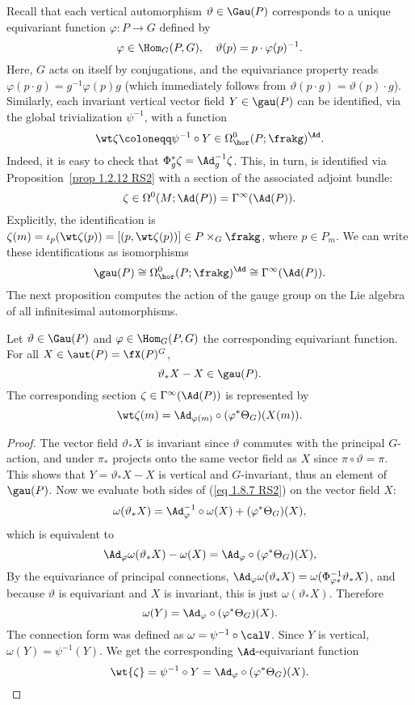 Recall that each vertical automorphism $\vartheta\in \Gau(P)$ corresponds to a unique equivariant function $\varphi:P\to G$ defined by 
\[\varphi\in \Hom_G(P,G),\quad \vartheta(p)=p\cdot \varphi(p)^{-1}.\]
Here, $G$ acts on itself by conjugations, and the equivariance property reads $\varphi(p\cdot g)=g^{-1}\varphi(p)g$ (which immediately follows from $\vartheta(p\cdot g)=\vartheta(p)\cdot g$). Similarly, each invariant vertical vector field $Y\in \gau(P)$ can be identified, via the global trivialization $\psi^{-1}$, with a function 
\[\wt\zeta\coloneqq \psi^{-1}\circ Y\in \Omega^0_{\hor}(P;\frakg)^\Ad.\]
Indeed, it is easy to check that $\Phi_g^\ast \zeta=\Ad_g^{-1}\zeta$. This, in turn, is identified via Proposition~\ref{prop 1.2.12 RS2} with a section of the associated adjoint bundle:
\[\zeta\in \Omega^0(M;\Ad(P))=\Gamma^\infty(\Ad(P)).\]
Explicitly, the identification is $\zeta(m)=\iota_p(\wt\zeta(p))=[(p,\wt\zeta(p))]\in P\times_G \frakg$, where $p\in P_m$.
We can write these identifications as isomorphisms
\[\gau(P)\cong \Omega^0_{\hor}(P;\frakg)^\Ad\cong \Gamma^\infty(\Ad(P)).\]
The next proposition computes the action of the gauge group on the Lie algebra of all infinitesimal automorphisms.

\begin{prop}
    Let $\vartheta\in\Gau(P)$ and $\varphi\in \Hom_G(P,G)$ the corresponding equivariant function. For all $X\in\aut(P)=\fX(P)^G$,
    \[\vartheta_\ast X-X\in\gau(P).\]
    The corresponding section $\zeta \in\Gamma^\infty(\Ad(P))$ is represented by
    \[\wt\zeta(m)=\Ad_{\varphi(m)}\circ(\varphi^\ast \Theta_G)(X(m)).\]
\end{prop}
\begin{proof}
    The vector field $\vartheta_\ast X$ is invariant since $\vartheta$ commutes with the principal $G$-action, and under $\pi_\ast$ projects onto the same vector field as $X$ since $\pi\circ\vartheta=\pi$. This shows that $Y=\vartheta_\ast X-X$ is vertical and $G$-invariant, thus an element of $\gau(P)$. Now we evaluate both sides of (\ref{eq 1.8.7 RS2}) on the vector field $X$:
    \[\omega(\vartheta_\ast X)=\Ad_{\varphi}^{-1}\circ \omega(X)+(\varphi^\ast \Theta_G)(X),\]
    which is equivalent to
    \[\Ad_\varphi\omega(\vartheta_\ast X)-\omega(X)=\Ad_\varphi\circ (\varphi^\ast \Theta_G)(X),\]
    By the equivariance of principal connections, $\Ad_\varphi\omega(\vartheta_\ast X)=\omega(\Phi_{\varphi\ast}^{-1}\vartheta_\ast X)$, and because $\vartheta$ is equivariant and $X$ is invariant, this is just $\omega(\vartheta_\ast X)$. Therefore
    \[\omega(Y)=\Ad_\varphi\circ (\varphi^\ast \Theta_G)(X).\]
    The connection form was defined as $\omega=\psi^{-1}\circ\calV$. Since $Y$ is vertical, $\omega(Y)=\psi^{-1}(Y)$. We get the corresponding $\Ad$-equivariant function
    \[\wt{\zeta}=\psi^{-1}\circ Y=\Ad_\varphi\circ (\varphi^\ast\Theta_G)(X).\]
\end{proof}

